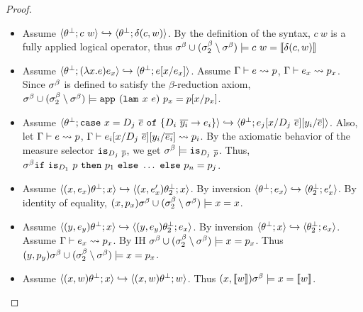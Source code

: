 \begin{proof}
\begin{itemize}
\item 
Assume
	$\langle {\theta_{}^\perp}; c\ w\rangle
	\hookrightarrow\langle {\theta_{}^\perp}; \delta(c, w)\rangle$. 
By the definition of the syntax, $c\ w$ is a fully applied logical operator, thus
  $\sigma^\beta \cup (\sigma^\beta_2 \setminus \sigma^\beta)
    \models {c\ w} = [\![\delta(c, w)]\!]$

\item 
Assume
	$\langle {\theta_{}^\perp}; (\lambda x. e) e_x\rangle
	\hookrightarrow\langle {\theta_{}^\perp}; e[{x}/{e_x}]\rangle$. 
Assume
  $ \Gamma\vdash e \rightsquigarrow p $,	
  $ \Gamma\vdash e_x \rightsquigarrow p_x $. 
Since $\sigma^\beta$ is defined to satisfy the $\beta$-reduction axiom, 
  $\sigma^\beta \cup (\sigma^\beta_2 \setminus \sigma^\beta)
    \models \texttt{app}^{}_{}\ {(\texttt{lam}^{}_{}\ {x}\ {e})}\ {p_x} =p[{x}/{p_x}]$. 
  
\item 
Assume
	$\track{\tsub{}}{\ecase{x}{D_j\ \overline{e}}{\dc_i}{\overline{y_i}}{e_i}}
	\hookrightarrow\track{\tsub{}}{e_j\subst{x}{D_j\ \overline{e}}\subst{y_i}{\overline{e}}}$. 
Also, let 
  $ \Gamma\vdash e \rightsquigarrow p $,	
  $\tologicshort{\Gamma}{\refa_i\subst{x}{D_j\ \overline{\refa}}\subst{y_i}{\overline{\refa_i}}}{}{\pred_i}{}{}{}$.
By the axiomatic behavior of the measure selector $\texttt{is}_{D_j\ \overline{p}}$, we get 
  $\bmodel\models \checkdc{\dc_j\ \overline{\pred}}$.
Thus, 
  $\bmodel
	 {\eif{\checkdc{\dc_1}\ \pred}{\pred_1}{\ldots} \ \mathtt{else}\ \pred_n}
	= \pred_j
  $.


\item 
Assume
	$\langle (x, e_x){\theta_{}^\perp}; x\rangle
	\hookrightarrow
	\langle (x, e_x'){\theta_{2}^\perp}; x\rangle$.
By inversion
	$\langle {\theta_{}^\perp}; e_x\rangle
	\hookrightarrow
	\langle {\theta_{2}^\perp}; e_x'\rangle$.
By identity of equality, 
  $(x, p_x)\sigma^\beta \cup (\sigma^\beta_2 \setminus \sigma^\beta)
    \models x = x$. 

\item 
Assume
	$\langle (y, e_y){\theta_{}^\perp}; x\rangle
	\hookrightarrow
	\langle (y, e_y){\theta_{2}^\perp}; e_x\rangle$.
By inversion
	$\langle {\theta_{}^\perp}; x\rangle
	\hookrightarrow
	\langle {\theta_{2}^\perp}; e_x\rangle$.
Assume 
  $ \Gamma\vdash e_x \rightsquigarrow p_x $.
By IH
  $\sigma^\beta \cup (\sigma^\beta_2 \setminus \sigma^\beta)
    \models x = p_x$. 
Thus  
  $(y,p_y)\sigma^\beta \cup (\sigma^\beta_2 \setminus \sigma^\beta)
    \models x = p_x$. 

\item 
Assume
	$\langle (x, w){\theta_{}^\perp}; x\rangle
	\hookrightarrow
	\langle (x, w){\theta_{}^\perp}; w\rangle$.
Thus  
  $(x,[\![w]\!])\sigma^\beta 
    \models x = [\![w]\!]$. 


\end{itemize}
\end{proof}
